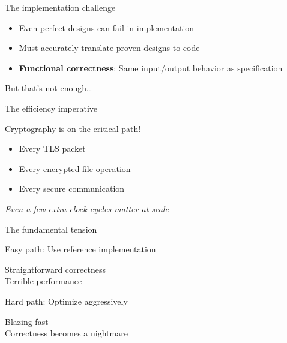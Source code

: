 \documentclass[aspectratio=169, lualatex, handout]{beamer}
\begin{document}
\begin{frame}{The implementation challenge}
	\begin{itemize}
		\item Even perfect designs can fail in implementation
		\item Must accurately translate proven designs to code
		\item \textbf{Functional correctness}: Same input/output behavior as specification
	\end{itemize}
	\vspace{1em}
	\begin{center}
		\Large
		But that's not enough\ldots
	\end{center}
\end{frame}

\begin{frame}{The efficiency imperative}
	\begin{center}
		\Large
		Cryptography is on the critical path!
	\end{center}
	\vspace{1em}
	\begin{itemize}
		\item Every TLS packet
		\item Every encrypted file operation
		\item Every secure communication
	\end{itemize}
	\vspace{0.5em}
	\begin{center}
		\textit{Even a few extra clock cycles matter at scale}
	\end{center}
\end{frame}

\begin{frame}{The fundamental tension}
	\begin{center}
		\Large
		Easy path: Use reference implementation

		\vspace{0.5em}

		\normalsize
		\mycheckmark Straightforward correctness \\
		\times Terrible performance
	\end{center}
	\vspace{1em}
	\begin{center}
		\Large
		Hard path: Optimize aggressively

		\vspace{0.5em}

		\normalsize
		\mycheckmark Blazing fast \\
		\times Correctness becomes a nightmare
	\end{center}
\end{frame}
\end{document}
